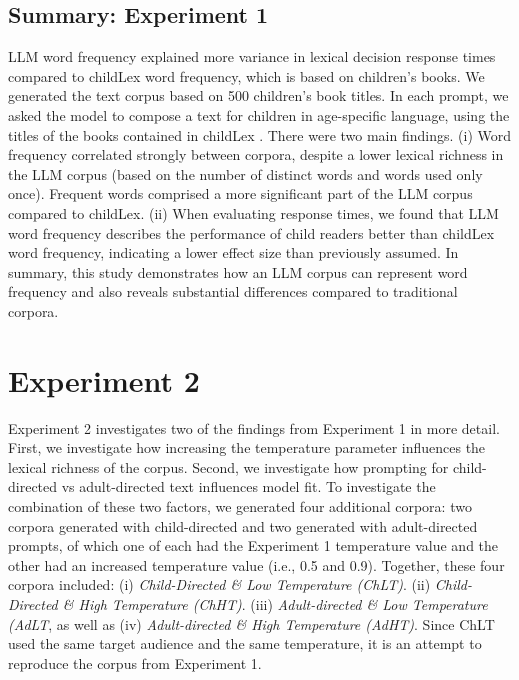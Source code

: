 \documentclass[manuscript]{stjour}
\begin{document}
\subsection{Summary: Experiment 1}

LLM word frequency explained more variance in lexical decision response times compared to childLex word frequency, which is based on children's books. We generated the text corpus based on 500 children's book titles. In each prompt, we asked the model to compose a text for children in age-specific language, using the titles of the books contained in childLex \citep[][]{schroeder_childlex_2015}. There were two main findings. (i) Word frequency correlated strongly between corpora, despite a lower lexical richness in the LLM corpus (based on the number of distinct words and words used only once). Frequent words comprised a more significant part of the LLM corpus compared to childLex. (ii) When evaluating response times, we found that LLM word frequency describes the performance of child readers better than childLex word frequency, indicating a lower effect size than previously assumed. In summary, this study demonstrates how an LLM corpus can represent word frequency and also reveals substantial differences compared to traditional corpora. 


\section{Experiment 2}

Experiment 2 investigates two of the findings from Experiment 1 in more detail. First, we investigate how increasing the temperature parameter influences the lexical richness of the corpus. Second, we investigate how prompting for child-directed vs adult-directed text influences model fit. To investigate the combination of these two factors, we generated four additional corpora: two corpora generated with child-directed and two generated with adult-directed prompts, of which one of each had the Experiment 1 temperature value and the other had an increased temperature value (i.e., 0.5 and 0.9). Together, these four corpora included: (i) \textit{Child-Directed \& Low Temperature (ChLT)}. (ii) \textit{Child-Directed \& High Temperature (ChHT)}. (iii) \textit{Adult-directed \& Low Temperature (AdLT}, as well as (iv) \textit{Adult-directed \& High Temperature (AdHT)}. Since ChLT used the same target audience and the same temperature, it is an attempt to reproduce the corpus from Experiment 1.
\end{document}
